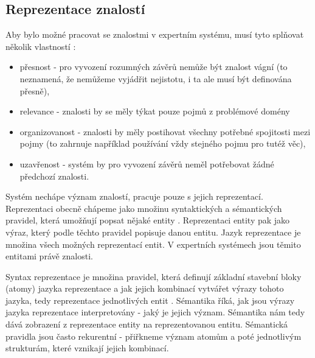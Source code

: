 \subsection{Reprezentace znalostí}
\label{knowledge representation}


Aby bylo možné pracovat se znalostmi v expertním systému, musí tyto splňovat
několik vlastností \cite{introduction}:
\begin{itemize}
  \item přesnost - pro vyvození rozumných závěrů nemůže být znalost vágní (to
    neznamená, že nemůžeme vyjádřit nejistotu, i ta ale musí být definována
    přesně),
  \item relevance - znalosti by se měly týkat pouze pojmů z problémové domény
  \item organizovanost - znalosti by měly postihovat všechny potřebné spojitosti
    mezi pojmy (to zahrnuje například používání vždy stejného pojmu pro tutéž
    věc),
  \item uzavřenost - systém by pro vyvození závěrů neměl potřebovat žádné
    předchozí znalosti.
\end{itemize}

Systém nechápe význam znalostí, pracuje pouze s jejich reprezentací.
Reprezentaci obecně chápeme jako množinu syntaktických a sémantických pravidel,
která umožňují popsat nějaké entity \cite{introduction}. Reprezentaci entity pak
jako výraz, který podle těchto pravidel popisuje danou entitu. Jazyk
reprezentace je množina všech možných reprezentací entit. V expertních systémech
jsou těmito entitami právě znalosti.

Syntax reprezentace je množina pravidel, která definují základní stavební bloky
(atomy) jazyka reprezentace a jak jejich kombinací vytvářet výrazy tohoto
jazyka, tedy reprezentace jednotlivých entit \cite{introduction}. Sémantika
říká, jak jsou výrazy jazyka reprezentace interpretovány - jaký je jejich
význam. Sémantika nám tedy dává zobrazení z reprezentace entity na
reprezentovanou entitu. Sémantická pravidla jsou často rekurentní - přiřkneme
význam atomům a poté jednotlivým strukturám, které vznikají jejich kombinací.

